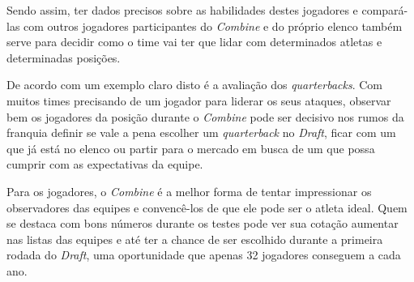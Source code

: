 Sendo assim, ter dados precisos sobre as habilidades destes jogadores e compará-las com outros jogadores participantes do \textit{Combine} e do próprio elenco também serve para decidir como o time vai ter que lidar com determinados atletas e determinadas posições.

De acordo com  um exemplo claro disto é a avaliação dos \textit{quarterbacks}. Com muitos times precisando de um jogador para liderar os seus ataques, observar bem os jogadores da posição durante o \textit{Combine} pode ser decisivo nos rumos da franquia definir se vale a pena escolher um \textit{quarterback} no \textit{Draft}, ficar com um que já está no elenco ou partir para o mercado em busca de um que possa cumprir com as expectativas da equipe.

Para os jogadores, o \textit{Combine} é a melhor forma de tentar impressionar os observadores das equipes e convencê-los de que ele pode ser o atleta ideal. Quem se destaca com bons números durante os testes pode ver sua cotação aumentar nas listas das equipes e até ter a chance de ser escolhido durante a primeira rodada do \textit{Draft}, uma oportunidade que apenas 32 jogadores conseguem a cada ano.